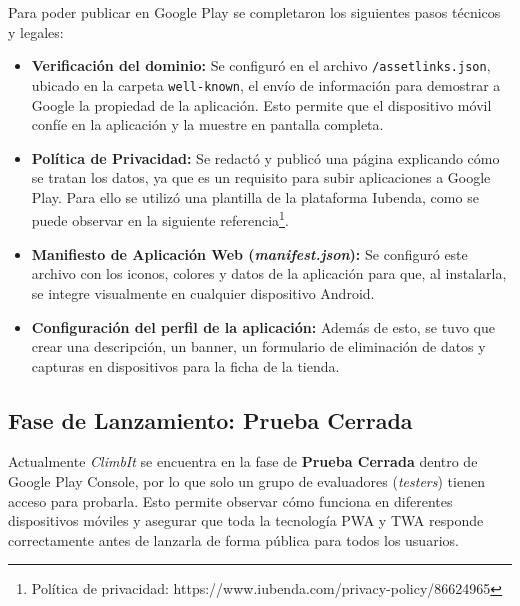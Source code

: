 Para poder publicar en Google Play se completaron los siguientes pasos técnicos y legales:
\begin{itemize}
    \item \textbf{Verificación del dominio:} Se configuró en el archivo \texttt{/assetlinks.json}, ubicado en la carpeta \texttt{well-known}, el envío de información para demostrar a Google la propiedad de la aplicación. Esto permite que el dispositivo móvil confíe en la aplicación y la muestre en pantalla completa.
    
    \item \textbf{Política de Privacidad:} Se redactó y publicó una página explicando cómo se tratan los datos, ya que es un requisito para subir aplicaciones a Google Play. Para ello se utilizó una plantilla de la plataforma Iubenda, como se puede observar en la siguiente referencia\footnote{Política de privacidad: https://www.iubenda.com/privacy-policy/86624965}.
    
    \item \textbf{Manifiesto de Aplicación Web (\textit{manifest.json}):} Se configuró este archivo con los iconos, colores y datos de la aplicación para que, al instalarla, se integre visualmente en cualquier dispositivo Android.
    
    \item \textbf{Configuración del perfil de la aplicación:} Además de esto, se tuvo que crear una descripción, un banner, un formulario de eliminación de datos y capturas en dispositivos para la ficha de la tienda.
\end{itemize}

\subsection{Fase de Lanzamiento: Prueba Cerrada}

Actualmente \textit{ClimbIt} se encuentra en la fase de \textbf{Prueba Cerrada} dentro de Google Play Console, por lo que solo un grupo de evaluadores (\textit{testers}) tienen acceso para probarla. Esto permite observar cómo funciona en diferentes dispositivos móviles y asegurar que toda la tecnología PWA y TWA responde correctamente antes de lanzarla de forma pública para todos los usuarios.